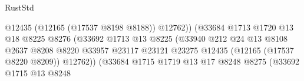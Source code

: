 \begin{lexlean}{RustStd}
\begin{coremodule}
                                                          @12435
                                                          (@12165 (@17537 @8198 @8188))
                                                          @12762))
                                                      (@33684
                                                        @1713
                                                        @1720
                                                        @13
                                                        @18
                                                        @8225
                                                        @8276
                                                        (@33692
                                                          @1713
                                                          @13
                                                          @8225
                                                          (@33940
                                                            @212
                                                            @24
                                                            @13
                                                            @8108
                                                            @2637
                                                            @8208
                                                            @8220
                                                            @33957
                                                            @23117
                                                            @23121
                                                            @23275
                                                            @12435
                                                            (@12165 (@17537 @8220 @8209))
                                                            @12762))
                                                        (@33684
                                                          @1715
                                                          @1719
                                                          @13
                                                          @17
                                                          @8248
                                                          @8275
                                                          (@33692
                                                            @1715
                                                            @13
                                                            @8248

\end{coremodule}
\end{lexlean}
